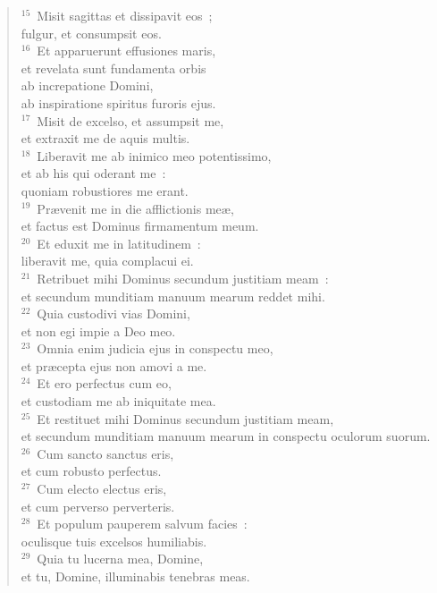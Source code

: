 \begin{verse}
${}^{15}$~Misit sagittas et dissipavit eos~;\\ fulgur, et consumpsit eos.\\
${}^{16}$~Et apparuerunt effusiones maris,\\ et revelata sunt fundamenta orbis\\ ab increpatione Domini,\\ ab inspiratione spiritus furoris ejus.\\
${}^{17}$~Misit de excelso, et assumpsit me,\\ et extraxit me de aquis multis.\\
${}^{18}$~Liberavit me ab inimico meo potentissimo,\\ et ab his qui oderant me~:\\ quoniam robustiores me erant.\\
${}^{19}$~Pr\ae venit me in die afflictionis me\ae ,\\ et factus est Dominus firmamentum meum.\\
${}^{20}$~Et eduxit me in latitudinem~:\\ liberavit me, quia complacui ei.\\
${}^{21}$~Retribuet mihi Dominus secundum justitiam meam~:\\ et secundum munditiam manuum mearum reddet mihi.\\
${}^{22}$~Quia custodivi vias Domini,\\ et non egi impie a Deo meo.\\
${}^{23}$~Omnia enim judicia ejus in conspectu meo,\\ et pr\ae cepta ejus non amovi a me.\\
${}^{24}$~Et ero perfectus cum eo,\\ et custodiam me ab iniquitate mea.\\
${}^{25}$~Et restituet mihi Dominus secundum justitiam meam,\\ et secundum munditiam manuum mearum in conspectu oculorum suorum.\\
${}^{26}$~Cum sancto sanctus eris,\\ et cum robusto perfectus.\\
${}^{27}$~Cum electo electus eris,\\ et cum perverso perverteris.\\
${}^{28}$~Et populum pauperem salvum facies~:\\ oculisque tuis excelsos humiliabis.\\
${}^{29}$~Quia tu lucerna mea, Domine,\\ et tu, Domine, illuminabis tenebras meas.\\

\end{verse}
